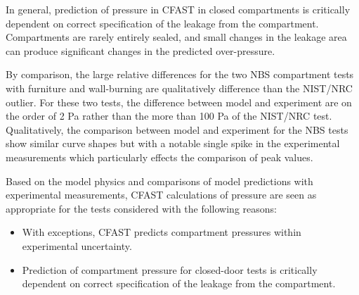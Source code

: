 In general, prediction of pressure in CFAST in closed compartments is critically dependent on correct specification of the leakage from the compartment.  Compartments are rarely entirely sealed, and small changes in the leakage area can produce significant changes in the predicted over-pressure.

By comparison, the large relative differences for the two NBS compartment tests with furniture and wall-burning are qualitatively difference than the NIST/NRC outlier.  For these two tests, the difference between model and experiment are on the order of 2 Pa rather than the more than 100 Pa of the NIST/NRC test.  Qualitatively, the comparison between model and experiment for the NBS tests show similar curve shapes but with a notable single spike in the experimental measurements which particularly effects the comparison of peak values.

Based on the model physics and comparisons of model predictions with experimental measurements, CFAST calculations of pressure are seen as appropriate for the tests considered with the following reasons:

\begin{itemize}
\item With exceptions, CFAST predicts compartment pressures within experimental uncertainty.
\item Prediction of compartment pressure for closed-door tests is critically dependent on correct specification of the leakage from the compartment.
\end{itemize}


